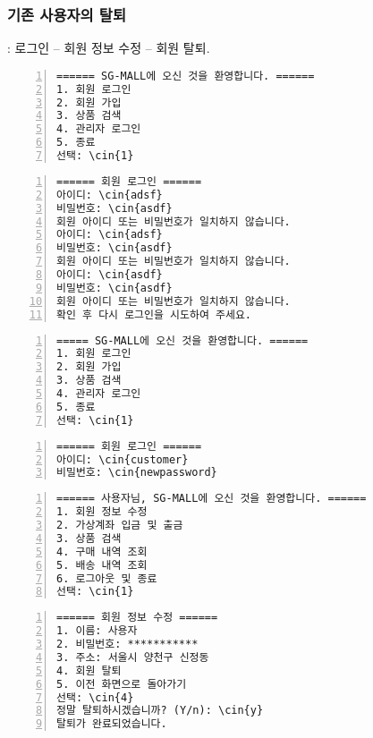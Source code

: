 \documentclass[runningheads]{llncs}
\newcommand{\cin}[1]{\textbf{\textcolor{orange}{#1}}}
\begin{document}
\subsubsection{기존 사용자의 탈퇴}: 로그인 -- 회원 정보 수정 -- 회원 탈퇴.

\begin{Verbatim}[frame=single,numbers=left,commandchars=\\\{\}]
====== SG-MALL에 오신 것을 환영합니다. ======
1. 회원 로그인
2. 회원 가입
3. 상품 검색
4. 관리자 로그인
5. 종료
선택: \cin{1}
\end{Verbatim}

\begin{Verbatim}[frame=single,numbers=left,commandchars=\\\{\}]
====== 회원 로그인 ======
아이디: \cin{adsf}
비밀번호: \cin{asdf}
회원 아이디 또는 비밀번호가 일치하지 않습니다.
아이디: \cin{adsf}
비밀번호: \cin{asdf}
회원 아이디 또는 비밀번호가 일치하지 않습니다.
아이디: \cin{asdf}
비밀번호: \cin{asdf}
회원 아이디 또는 비밀번호가 일치하지 않습니다.
확인 후 다시 로그인을 시도하여 주세요.
\end{Verbatim}

\begin{Verbatim}[frame=single,numbers=left,commandchars=\\\{\}]
===== SG-MALL에 오신 것을 환영합니다. ======
1. 회원 로그인
2. 회원 가입
3. 상품 검색
4. 관리자 로그인
5. 종료
선택: \cin{1}
\end{Verbatim}

\begin{Verbatim}[frame=single,numbers=left,commandchars=\\\{\}]
====== 회원 로그인 ======
아이디: \cin{customer}
비밀번호: \cin{newpassword}
\end{Verbatim}

\begin{Verbatim}[frame=single,numbers=left,commandchars=\\\{\}]
====== 사용자님, SG-MALL에 오신 것을 환영합니다. ======
1. 회원 정보 수정
2. 가상계좌 입금 및 출금
3. 상품 검색
4. 구매 내역 조회
5. 배송 내역 조회
6. 로그아웃 및 종료
선택: \cin{1}
\end{Verbatim}

\begin{Verbatim}[frame=single,numbers=left,commandchars=\\\{\}]
====== 회원 정보 수정 ======
1. 이름: 사용자
2. 비밀번호: ***********
3. 주소: 서울시 양천구 신정동
4. 회원 탈퇴
5. 이전 화면으로 돌아가기
선택: \cin{4}
정말 탈퇴하시겠습니까? (Y/n): \cin{y}
탈퇴가 완료되었습니다.
\end{Verbatim}
\end{document}
